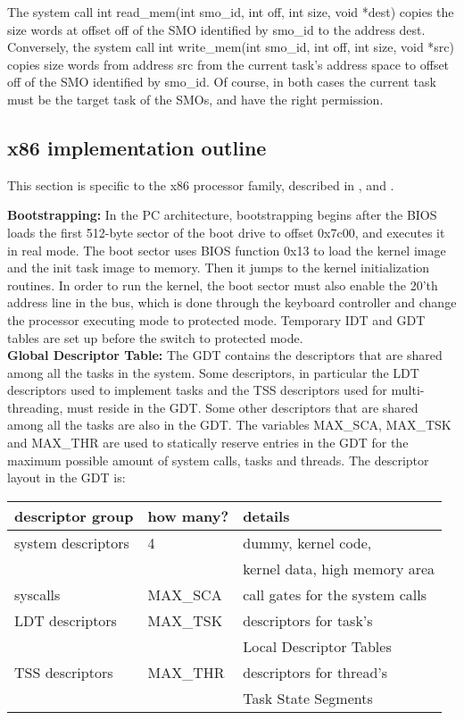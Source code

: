 \documentclass[12pt, letterpaper, oneside, english]{article}
\begin{document}
The system call \textsf{int read\_mem(int smo\_id, int off, int size, void *dest)} copies the \textsf{size} words at offset \textsf{off} of the SMO identified by \textsf{smo\_id} to the address \textsf{dest}. Conversely, the system call \textsf{int write\_mem(int smo\_id, int off, int size, void *src)} copies \textsf{size} words from address \textsf{src} from the current task's address space to offset \textsf{off} of the SMO identified by \textsf{smo\_id}. Of course, in both cases the current task must be the target task of the SMOs, and have the right permission.

\subsection{x86 implementation outline} \label{subsec:GDT}

This section is specific to the x86 processor family, described in \cite{Int1}, \cite{Int2} and \cite{Int3}. 

\noindent \textbf{Bootstrapping:} In the PC architecture, bootstrapping begins after the BIOS loads the first 512-byte sector of the boot drive to offset 0x7c00, and executes it in real mode. The boot sector uses BIOS function 0x13 to load the kernel image and the init task image to memory. Then it jumps to the kernel initialization routines. In order to run the kernel, the boot sector must also enable the 20'th address line in the bus, which is done through the keyboard controller and change the processor executing mode to protected mode. Temporary IDT and GDT tables are set up before the switch to protected mode. \\
\textbf{Global Descriptor Table:} The GDT contains the descriptors that are shared among all the tasks in the system. Some descriptors, in particular the LDT descriptors used to implement tasks and the TSS descriptors used for multi-threading, must reside in the GDT. Some other descriptors that are shared among all the tasks are also in the GDT. The variables \textsf{MAX\_SCA}, \textsf{MAX\_TSK} and \textsf{MAX\_THR} are used to statically reserve entries in the GDT for the maximum possible amount of system calls, tasks and threads. The descriptor layout in the GDT is: \\

\begin{tabular}{|l|l|l|}
\hline
\textbf{descriptor group} & \textbf{how many?} & \textbf{details} \\
\hline
system descriptors & 4 & dummy, kernel code, \\
 & & kernel data, high memory area \\
\hline
syscalls & \textsf{MAX\_SCA} & call gates for the system calls \\
\hline
LDT descriptors & \textsf{MAX\_TSK} & descriptors for task's \\
 & & Local Descriptor Tables \\
\hline
TSS descriptors & \textsf{MAX\_THR} & descriptors for thread's \\
 & & Task State Segments \\
\hline 
\end{tabular}
\\
\end{document}
